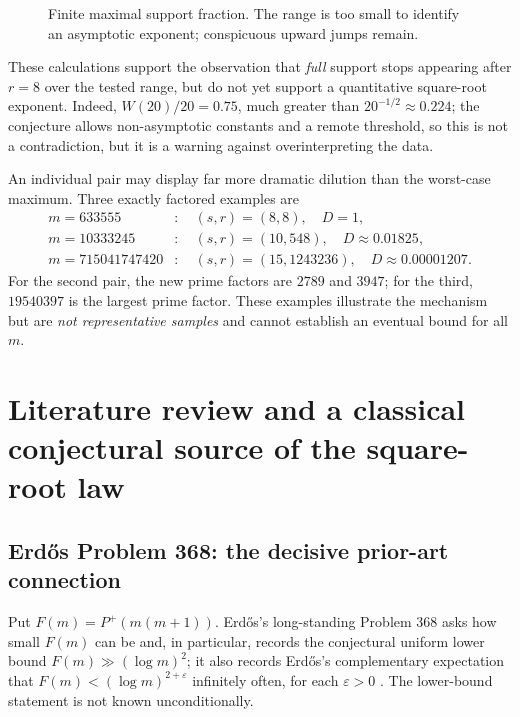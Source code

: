 \documentclass[11pt,letterpaper]{article}
\theoremstyle{remark}
\begin{document}
\begin{figure}[htbp]
\centering
{}
\caption{Finite maximal support fraction. The range is too small
to identify an asymptotic exponent; conspicuous upward jumps remain.}
\end{figure}

These calculations support the observation that \emph{full} support
stops appearing after $r=8$ over the tested range, but do not yet
support a quantitative square-root exponent. Indeed,
$W(20)/20=0.75$, much greater than $20^{-1/2}\approx0.224$;
the conjecture allows non-asymptotic constants and a remote
threshold, so this is not a contradiction, but it is a warning against
overinterpreting the data.

An individual pair may display far more dramatic dilution than the
worst-case maximum. Three exactly factored examples are
\begin{align*}
 m=633555 &: \quad (s,r)=(8,8),\quad D=1,\\
 m=10333245 &: \quad (s,r)=(10,548),\quad D\approx0.01825,\\
 m=715041747420 &: \quad (s,r)=(15,1243236),\quad D\approx0.00001207.
\end{align*}
For the second pair, the new prime factors are $2789$ and $3947$;
for the third, $19540397$ is the largest prime factor. These examples
illustrate the mechanism but are \emph{not representative samples}
and cannot establish an eventual bound for all $m$.


\section{Literature review and a classical conjectural source of the square-root law}\label{sec:lit}
\subsection{Erd\H{o}s Problem 368: the decisive prior-art connection}
Put $F(m)=P^+(m(m+1))$. Erd\H{o}s's long-standing Problem 368 asks
how small $F(m)$ can be and, in particular, records the conjectural
uniform lower bound $F(m)\gg(\log m)^2$; it also records Erd\H{o}s's
complementary expectation that $F(m)<(\log m)^{2+\varepsilon}$
infinitely often, for each $\varepsilon>0$ \cite{Erdos368,Erdos1976}.
The lower-bound statement is not known unconditionally.
\end{document}
